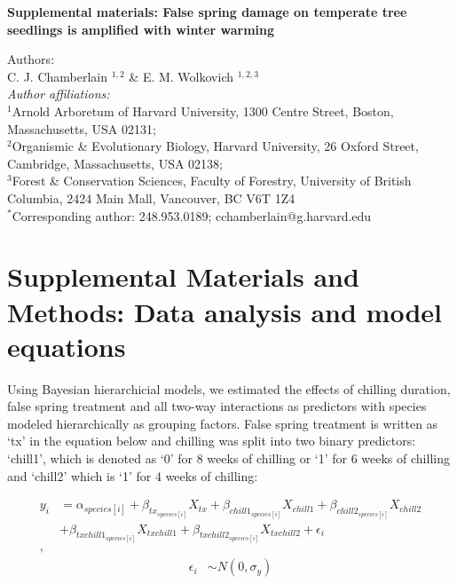 \documentclass{article}\usepackage[]{graphicx}\usepackage[]{color}
\begin{document}
\noindent \textbf{\Large{Supplemental materials: False spring damage on temperate tree seedlings is amplified with winter warming}}

\noindent Authors:\\
C. J. Chamberlain $^{1,2}$ \& E. M. Wolkovich $^{1,2,3}$
\vspace{2ex}\\
\emph{Author affiliations:}\\
$^{1}$Arnold Arboretum of Harvard University, 1300 Centre Street, Boston, Massachusetts, USA 02131; \\
$^{2}$Organismic \& Evolutionary Biology, Harvard University, 26 Oxford Street, Cambridge, Massachusetts, USA 02138; \\
$^{3}$Forest \& Conservation Sciences, Faculty of Forestry, University of British Columbia, 2424 Main Mall, Vancouver, BC V6T 1Z4\\
\vspace{2ex}
$^*$Corresponding author: 248.953.0189; cchamberlain@g.harvard.edu\\

\renewcommand{\thetable}{S\arabic{table}}
\renewcommand{\thefigure}{S\arabic{figure}}
\renewcommand{\labelitemi}{$-$}



\section*{Supplemental Materials and Methods: Data analysis and model equations}
Using Bayesian hierarchicial models, we estimated the effects of chilling duration, false spring treatment and all two-way interactions as predictors with species modeled hierarchically as grouping factors. False spring treatment is written as `tx' in the equation below and chilling was split into two binary predictors: `chill1', which is denoted as `0' for 8 weeks of chilling or `1' for 6 weeks of chilling and `chill2' which is `1' for 4 weeks of chilling:

\begin{align*}
y_i &= \alpha_{species[i]} + \beta_{tx_{species[i]}}X_{tx} + \beta_{chill1_{species[i]}}X_{chill1} + \beta_{chill2_{species[i]}}X_{chill2}\\
&+ \beta_{txchill1_{species[i]}}X_{txchill1} + \beta_{txchill2_{species[i]}}X_{txchill2} + \epsilon_i \tag{1}\\,
\end{align*}
\begin{align*}
\epsilon_i & \sim N(0,\sigma_y) \\
\end{align*}
\end{document}

